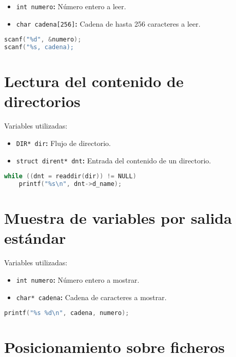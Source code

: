 \begin{itemize}
	\item\texttt{int numero}\textbf{:} Número entero a leer.
	\item\texttt{char cadena[256]}\textbf{:} Cadena de hasta 256 caracteres a leer.
\end{itemize}

\begin{lstlisting}[language=C]
scanf("%d", &numero);
scanf("%s, cadena);
\end{lstlisting}

\section{Lectura del contenido de directorios}

Variables utilizadas:

\begin{itemize}
	\item\texttt{DIR* dir}\textbf{:} Flujo de directorio.
	\item\texttt{struct dirent* dnt}\textbf{:} Entrada del contenido de un directorio.
\end{itemize}

\begin{lstlisting}[language=C]
while ((dnt = readdir(dir)) != NULL)
	printf("%s\n", dnt->d_name);
\end{lstlisting}

\pagebreak

\section{Muestra de variables por salida estándar}

Variables utilizadas:

\begin{itemize}
	\item\texttt{int numero}\textbf{:} Número entero a mostrar.
	\item\texttt{char* cadena}\textbf{:} Cadena de caracteres a mostrar.
\end{itemize}

\begin{lstlisting}[language=C]
printf("%s %d\n", cadena, numero);
\end{lstlisting}

\section{Posicionamiento sobre ficheros}

